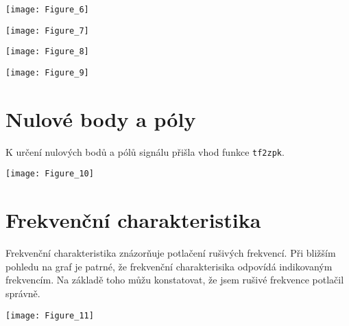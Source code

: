\documentclass[10pt,a4paper,twocolumn]{article}
\begin{document}
	\hspace*{-0.8cm}
	\texttt{[image: Figure\_6]}
	
	\hspace*{-0.8cm}
	\texttt{[image: Figure\_7]}
	
	\hspace*{-0.8cm}
	\texttt{[image: Figure\_8]}
	
	\hspace*{-0.5cm} 
	\texttt{[image: Figure\_9]}
	
	\section{Nulové body a póly}
	K určení nulových bodů a pólů signálu přišla vhod funkce \texttt{tf2zpk}.
	
	\texttt{[image: Figure\_10]}
	
	\section{Frekvenční charakteristika}
	Frekvenční charakteristika znázorňuje potlačení rušivých frekvencí. Při bližším pohledu na graf je patrné, že frekvenční charakterisika odpovídá indikovaným frekvencím. Na základě toho můžu konstatovat, že jsem rušivé frekvence potlačil správně.
	
	\hspace*{-0.5cm} 
	\texttt{[image: Figure\_11]}
	
	
\end{document}
